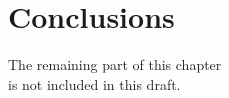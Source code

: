 \chapter{Conclusions}
\label{chap:conc}


\parbox[c][6cm][c]{\textwidth}{\LARGE
\centering
The remaining part of this chapter \\
is not included in this draft.
} 